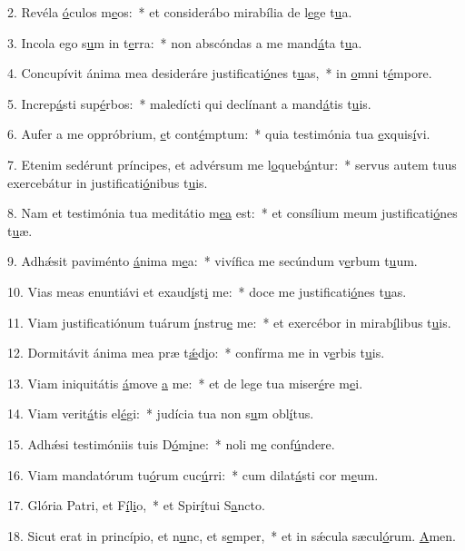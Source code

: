 2. Revéla \uline{ó}culos m\uline{e}os:~* et considerábo mirabília de l\uline{e}ge t\uline{u}a.\par 
3. Incola ego s\uline{u}m in t\uline{e}rra:~* non abscóndas a me mand\uline{á}ta t\uline{u}a.\par 
4. Concupívit ánima mea desideráre justificati\uline{ó}nes t\uline{u}as,~* in \uline{o}mni t\uline{é}mpore.\par 
5. Increp\uline{á}sti sup\uline{é}rbos:~* maledícti qui declínant a mand\uline{á}tis t\uline{u}is.\par 
6. Aufer a me oppróbrium, \uline{e}t cont\uline{é}mptum:~* quia testimónia tua \uline{e}xquis\uline{í}vi.\par 
7. Etenim sedérunt príncipes, et advérsum me l\uline{o}queb\uline{á}ntur:~* servus autem tuus exercebátur in justificati\uline{ó}nibus t\uline{u}is.\par 
8. Nam et testimónia tua meditátio m\uline{e}\uline{a} est:~* et consílium meum justificati\uline{ó}nes t\uline{u}æ.\par 
9. Adhǽsit paviménto \uline{á}nima m\uline{e}a:~* vivífica me secúndum v\uline{e}rbum t\uline{u}um.\par 
10. Vias meas enuntiávi et exaud\uline{í}st\uline{i} me:~* doce me justificati\uline{ó}nes t\uline{u}as.\par 
11. Viam justificatiónum tuárum \uline{í}nstru\uline{e} me:~* et exercébor in mirab\uline{í}libus t\uline{u}is.\par 
12. Dormitávit ánima mea præ t\uline{ǽ}d\uline{i}o:~* confírma me in v\uline{e}rbis t\uline{u}is.\par 
13. Viam iniquitátis \uline{á}move \uline{a} me:~* et de lege tua miser\uline{é}re m\uline{e}i.\par 
14. Viam verit\uline{á}tis el\uline{é}gi:~* judícia tua non s\uline{u}m obl\uline{í}tus.\par 
15. Adhǽsi testimóniis tuis D\uline{ó}m\uline{i}ne:~* noli m\uline{e} conf\uline{ú}ndere.\par 
16. Viam mandatórum tu\uline{ó}rum cuc\uline{ú}rri:~* cum dilat\uline{á}sti cor m\uline{e}um.\par 
17. Glória Patri, et F\uline{í}l\uline{i}o,~* et Spir\uline{í}tui S\uline{a}ncto.\par 
18. Sicut erat in princípio, et n\uline{u}nc, et s\uline{e}mper,~* et in sǽcula sæcul\uline{ó}rum. \uline{A}men.\par 
